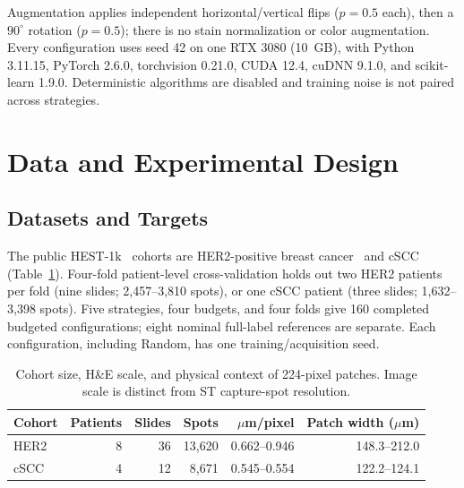 \documentclass[]{spie}
\begin{document}
Augmentation applies independent horizontal/vertical flips ($p=0.5$ each), then a $90^\circ$ rotation ($p=0.5$); there is no stain normalization or color augmentation. Every configuration uses seed 42 on one RTX 3080 (10~GB), with Python 3.11.15, PyTorch 2.6.0, torchvision 0.21.0, CUDA 12.4, cuDNN 9.1.0, and scikit-learn 1.9.0. Deterministic algorithms are disabled and training noise is not paired across strategies.

\section{Data and Experimental Design}
\label{sec:data}
\subsection{Datasets and Targets}
\label{sec:setup}

The public HEST-1k~\cite{jaume2024hest} cohorts are HER2-positive breast cancer~\cite{andersson2021spatial} and cSCC~\cite{ji2020multimodal} (Table~\ref{tab:datasets}). Four-fold patient-level cross-validation holds out two HER2 patients per fold (nine slides; 2,457--3,810 spots), or one cSCC patient (three slides; 1,632--3,398 spots). Five strategies, four budgets, and four folds give 160 completed budgeted configurations; eight nominal full-label references are separate. Each configuration, including Random, has one training/acquisition seed.

\begin{table}[htbp]
\centering
\caption{Cohort size, H\&E scale, and physical context of 224-pixel patches. Image scale is distinct from ST capture-spot resolution.}
\label{tab:datasets}
\begin{tabular}{lrrrrr}
\hline
Cohort & Patients & Slides & Spots & $\mu$m/pixel & Patch width ($\mu$m) \\
\hline
HER2 & 8 & 36 & 13,620 & 0.662--0.946 & 148.3--212.0 \\
cSCC & 4 & 12 & 8,671 & 0.545--0.554 & 122.2--124.1 \\
\hline
\end{tabular}
\end{table}
\end{document}

